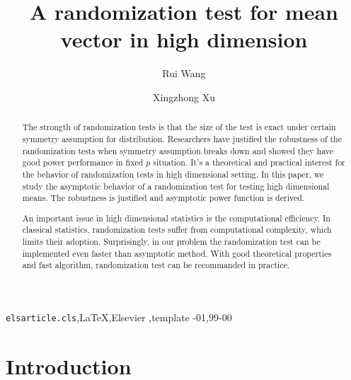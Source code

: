 \documentclass[review]{elsarticle}
\theoremstyle{plain}
\theoremstyle{definition}
\theoremstyle{remark}
\begin{document}
\begin{frontmatter}

\title{A randomization test for mean vector in high dimension}

    \author[mymainaddress]{Rui Wang}
    \author[mymainaddress,mysecondaryaddress]{Xingzhong Xu}
    \address[mymainaddress]{School of Mathematics and Statistics, Beijing Institute of Technology, Beijing 
    100081,China}
    \address[mysecondaryaddress]{Beijing Key Laboratory on MCAACI, Beijing Institute of Technology, Beijing 100081,China}
    
    
\begin{abstract}
    The strongth of randomization tests is that the size of the test is exact under certain symmetry assumption for distribution.
    Researchers have justified the robustness of the randomization tests when symmetry assumption breaks down and showed they have good power performance in fixed $p$ situation.
    It's a theoretical and practical interest for the behavior of randomization tests in high dimensional setting.
    In this paper, we study the asymptotic behavior of a randomization test for testing high dimensional means. 
    The robustness is justified and asymptotic power function is derived.
    
     An important issue in high dimensional statistics is the computational efficiency.
    In classical statistics, randomization tests suffer from computational complexity, which limits their adoption. Surprisingly, in our problem the randomization test can be implemented even faster than asymptotic method.
    With good theoretical properties and fast algorithm, randomization test can be recommanded in practice.
\end{abstract}

\begin{keyword}
\texttt{elsarticle.cls}\sep \LaTeX\sep Elsevier \sep template
-01\sep  99-00
\end{keyword}

\end{frontmatter}

\linenumbers


\section{Introduction}
\end{document}
